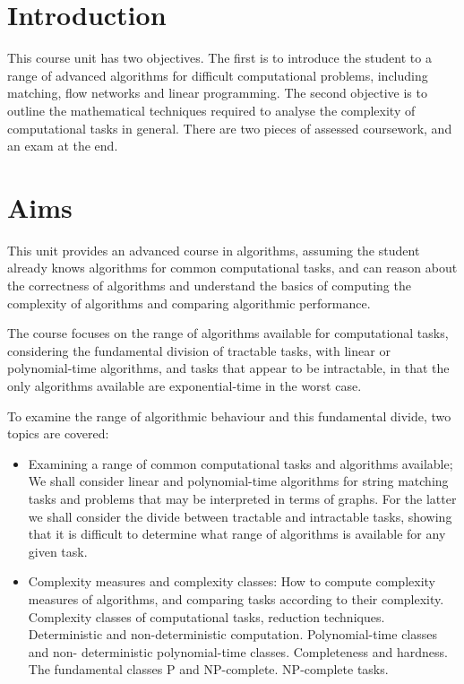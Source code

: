 \section*{Introduction}

This course unit has two objectives. The first is to introduce the student to a
range of advanced algorithms for difficult computational problems, including
matching, flow networks and linear programming. The second objective is to
outline the mathematical techniques required to analyse the complexity of
computational tasks in general. There are two pieces of assessed coursework, and
an exam at the end.

\section*{Aims}

This unit provides an advanced course in algorithms, assuming the student
already knows algorithms for common computational tasks, and can reason about
the correctness of algorithms and understand the basics of computing the
complexity of algorithms and comparing algorithmic performance.

The course focuses on the range of algorithms available for computational tasks,
considering the fundamental division of tractable tasks, with linear or
polynomial-time algorithms, and tasks that appear to be intractable, in that the
only algorithms available are exponential-time in the worst case.

To examine the range of algorithmic behaviour and this fundamental divide, two
topics are covered:

\begin{itemize}

  \item Examining a range of common computational tasks and algorithms available;
  We shall consider linear and polynomial-time algorithms for string matching
  tasks and problems that may be interpreted in terms of graphs. For the latter
  we shall consider the divide between tractable and intractable tasks, showing
  that it is difficult to determine what range of algorithms is available for
  any given task.

  \item Complexity measures and complexity classes: How to compute complexity
  measures of algorithms, and comparing tasks according to their complexity.
  Complexity classes of computational tasks, reduction techniques. Deterministic
  and non-deterministic computation. Polynomial-time classes and non-
  deterministic polynomial-time classes. Completeness and hardness. The
  fundamental classes P and NP-complete. NP-complete tasks.

\end{itemize}

